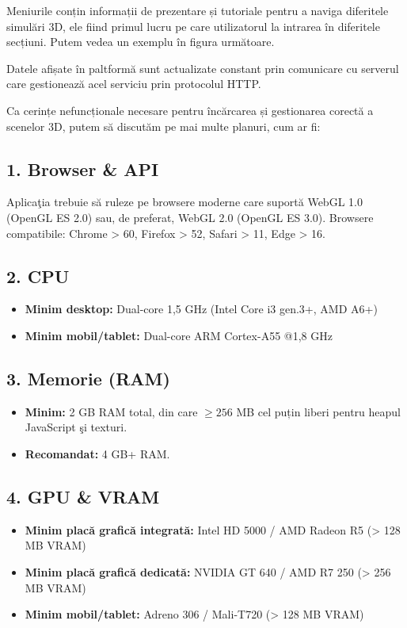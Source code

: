 Meniurile conțin informații de prezentare și tutoriale pentru a naviga diferitele simulări 3D, ele fiind primul
lucru pe care utilizatorul la intrarea în diferitele secțiuni. Putem vedea un exemplu în figura următoare.


Datele afișate în paltformă sunt actualizate constant prin comunicare cu serverul care gestionează acel serviciu
prin protocolul HTTP.

Ca cerințe nefuncționale necesare pentru încărcarea și gestionarea corectă a scenelor 3D, putem să discutăm pe 
mai multe planuri, cum ar fi:

\subsection*{1. Browser \& API}
Aplicaţia trebuie să ruleze pe browsere moderne care suportă WebGL 1.0 (OpenGL ES 2.0) sau, de preferat, WebGL 2.0 (OpenGL ES 3.0).  
Browsere compatibile: Chrome > 60, Firefox > 52, Safari > 11, Edge > 16.

\subsection*{2. CPU}
\begin{itemize}
  \item \textbf{Minim desktop:} Dual-core 1,5 GHz (Intel Core i3 gen.3+, AMD A6+)
  \item \textbf{Minim mobil/tablet:} Dual-core ARM Cortex-A55 @1,8 GHz
\end{itemize}

\subsection*{3. Memorie (RAM)}
\begin{itemize}
  \item \textbf{Minim:} 2 GB RAM total, din care \(\ge 256\) MB cel puțin liberi pentru heapul JavaScript şi texturi.
  \item \textbf{Recomandat:} 4 GB+ RAM.
\end{itemize}

\subsection*{4. GPU \& VRAM}
\begin{itemize}
  \item \textbf{Minim placă grafică integrată:} Intel HD 5000 / AMD Radeon R5 (> 128 MB VRAM)
  \item \textbf{Minim  placă grafică dedicată:} NVIDIA GT 640 / AMD R7 250 (> 256 MB VRAM)
  \item \textbf{Minim mobil/tablet:} Adreno 306 / Mali-T720 (> 128 MB VRAM)
\end{itemize}

